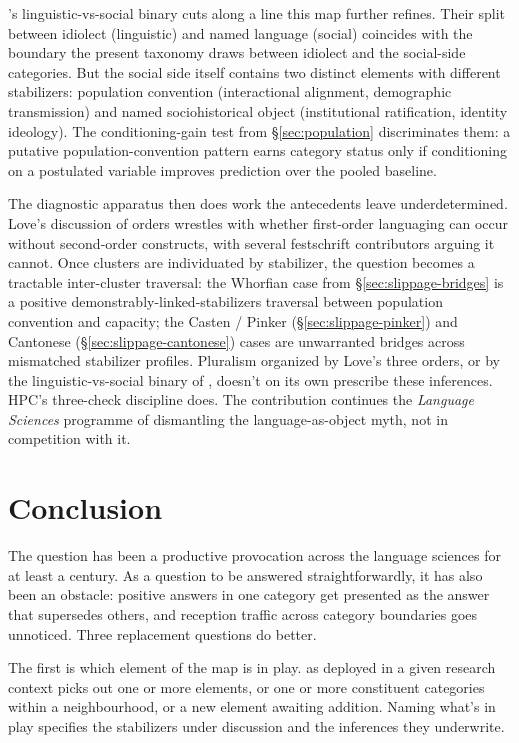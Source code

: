 \documentclass[12pt]{article}
\begin{document}
\textcite{otheguyGarciaReid2015}'s linguistic-vs-social binary cuts along a line this map further refines. Their split between idiolect (linguistic) and named language (social) coincides with the boundary the present taxonomy draws between idiolect and the social-side categories. But the social side itself contains two distinct elements with different stabilizers: population convention (interactional alignment, demographic transmission) and named sociohistorical object (institutional ratification, identity ideology). The conditioning-gain test from §\ref{sec:population} discriminates them: a putative population-convention pattern earns category status only if conditioning on a postulated variable improves prediction over the pooled baseline.

The diagnostic apparatus then does work the antecedents leave underdetermined. Love's discussion of orders wrestles with whether first-order languaging can occur without second-order constructs, with several festschrift contributors arguing it cannot. Once clusters are individuated by stabilizer, the question becomes a tractable inter-cluster traversal: the Whorfian case from §\ref{sec:slippage-bridges} is a positive demonstrably-linked-stabilizers traversal between population convention and capacity; the Casten / Pinker (§\ref{sec:slippage-pinker}) and Cantonese (§\ref{sec:slippage-cantonese}) cases are unwarranted bridges across mismatched stabilizer profiles. Pluralism organized by Love's three orders, or by the linguistic-vs-social binary of \textcite{otheguyGarciaReid2015}, doesn't on its own prescribe these inferences. HPC's three-check discipline does. The contribution continues the \textit{Language Sciences} programme of dismantling the language-as-object myth, not in competition with it.

\section{Conclusion}\label{sec:conclusion}

The question  has been a productive provocation across the language sciences for at least a century. As a question to be answered straightforwardly, it has also been an obstacle: positive answers in one category get presented as the answer that supersedes others, and reception traffic across category boundaries goes unnoticed. Three replacement questions do better.

The first is which element of the map is in play.  as deployed in a given research context picks out one or more elements, or one or more constituent categories within a neighbourhood, or a new element awaiting addition. Naming what's in play specifies the stabilizers under discussion and the inferences they underwrite.
\end{document}
